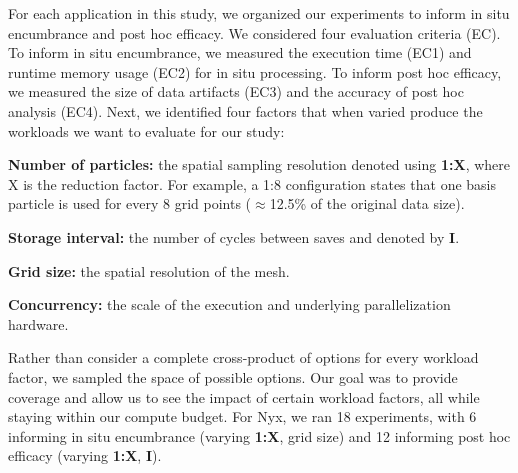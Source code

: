 For each application in this study, we organized our experiments to inform in situ encumbrance and post hoc efficacy. 
%
We considered four evaluation criteria (EC).
%
To inform in situ encumbrance,  we measured the execution time (EC1) and runtime memory usage (EC2) for in situ processing.
%
To inform post hoc efficacy, we measured the size of data artifacts (EC3) and the accuracy of post hoc analysis (EC4).
%
Next, we identified four factors that when varied produce the workloads we want to evaluate for our study:
\begin{tightItemize}
\item\textbf{Number of particles:} the spatial sampling resolution denoted using \textbf{1:X}, where X is the reduction factor. For example, a 1:8 configuration states that one basis particle is used for every 8 grid points ($\approx$12.5\% of the original data size).  
\item\textbf{Storage interval:} the number of cycles between saves and denoted by \textbf{I}.
\item\textbf{Grid size:} the spatial resolution of the mesh. 
\item\textbf{Concurrency:} the scale of the execution and underlying parallelization hardware.
\end{tightItemize}
%
%
Rather than consider a complete cross-product of options for every workload factor, we sampled the space of possible options.
%
Our goal was to provide coverage and allow us to see the impact of certain workload factors, all while staying within our compute budget.
%
For Nyx, we ran 18 experiments, with 6 informing in situ encumbrance (varying \textbf{1:X}, grid size) and 12 informing post hoc efficacy (varying \textbf{1:X}, \textbf{I}).
